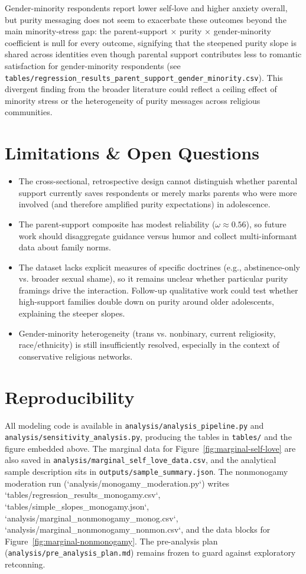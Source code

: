 \documentclass[12pt]{article}
\begin{document}
Gender-minority respondents report lower self-love and higher anxiety overall, but purity messaging does not seem to exacerbate these outcomes beyond the main minority-stress gap: the parent-support × purity × gender-minority coefficient is null for every outcome, signifying that the steepened purity slope is shared across identities even though parental support contributes less to romantic satisfaction for gender-minority respondents (see \texttt{tables/regression\_results\_parent\_support\_gender\_minority.csv}). This divergent finding from the broader literature could reflect a ceiling effect of minority stress or the heterogeneity of purity messages across religious communities.

\section{Limitations \& Open Questions}
\begin{itemize}
  \item The cross-sectional, retrospective design cannot distinguish whether parental support currently saves respondents or merely marks parents who were more involved (and therefore amplified purity expectations) in adolescence.
  \item The parent-support composite has modest reliability ($\omega \approx 0.56$), so future work should disaggregate guidance versus humor and collect multi-informant data about family norms.
  \item The dataset lacks explicit measures of specific doctrines (e.g., abstinence-only vs. broader sexual shame), so it remains unclear whether particular purity framings drive the interaction. Follow-up qualitative work could test whether high-support families double down on purity around older adolescents, explaining the steeper slopes.
  \item Gender-minority heterogeneity (trans vs. nonbinary, current religiosity, race/ethnicity) is still insufficiently resolved, especially in the context of conservative religious networks.
\end{itemize}

\section{Reproducibility}
All modeling code is available in \texttt{analysis/analysis\_pipeline.py} and \texttt{analysis/sensitivity\_analysis.py}, producing the tables in \texttt{tables/} and the figure embedded above. The marginal data for Figure~\ref{fig:marginal-self-love} are also saved in \texttt{analysis/marginal\_self\_love\_data.csv}, and the analytical sample description sits in \texttt{outputs/sample\_summary.json}. The nonmonogamy moderation run (`analysis/monogamy\_moderation.py`) writes `tables/regression\_results\_monogamy.csv`, `tables/simple\_slopes\_monogamy.json`, `analysis/marginal\_nonmonogamy\_monog.csv`, `analysis/marginal\_nonmonogamy\_nonmon.csv`, and the data blocks for Figure~\ref{fig:marginal-nonmonogamy}. The pre-analysis plan (\texttt{analysis/pre\_analysis\_plan.md}) remains frozen to guard against exploratory retconning.
\end{document}
